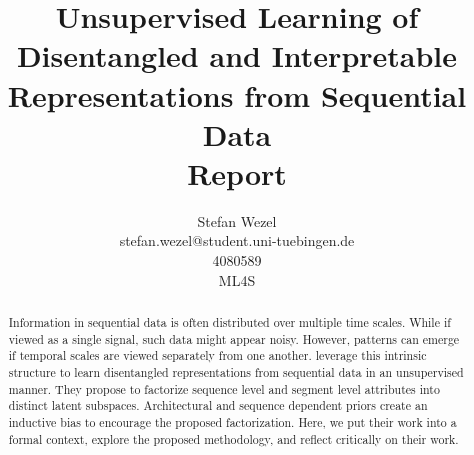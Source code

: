 \documentclass{article} %
\title{Unsupervised Learning of Disentangled and Interpretable Representations from Sequential Data\\ \vspace{0.5cm}\large{Report}}
\author{Stefan Wezel \\ stefan.wezel@student.uni-tuebingen.de \\4080589  \\ ML4S}
\begin{document}
\maketitle

\begin{abstract}

%



Information in sequential data is often distributed over multiple time scales.
While if viewed as a single signal, such data might appear noisy. However, patterns can emerge if temporal scales are viewed separately from one another.
\citet{hsu2017unsupervised} leverage this intrinsic structure to learn disentangled representations from sequential data in an unsupervised manner. They propose to factorize sequence level and segment level attributes into distinct latent subspaces. Architectural and sequence dependent priors create an inductive bias to encourage the proposed factorization. Here, we put their work into a formal context, explore the proposed methodology, and reflect critically on their work.
\end{abstract}
\end{document}
